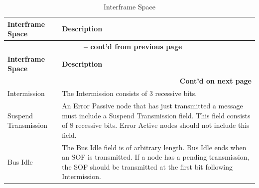 \begin{longtable}[c]{|p{4cm}|p{11cm}|} 
  \caption{Interframe Space}
  \label{tab:twai-interframe-space} 
  \\\hline
  \rowcolor{lightgray}
  \textbf{Interframe Space} & \textbf{Description}
  \\\hline
  \endfirsthead
  
  \multicolumn{2}{c}{\bfseries \tablename\ \thetable{} -- cont'd from previous page}\\  \hline
  
  \rowcolor{lightgray}
    \textbf{Interframe Space} & \textbf{Description}
  \\\hline
  \endhead
  
  \multicolumn{2}{r}{\textbf{Cont'd on next page}} \\
  \endfoot
  \endlastfoot

    Intermission & The Intermission consists of 3 recessive bits.
           \\\hline
    Suspend Transmission & An Error Passive node that has just transmitted a message must include a Suspend Transmission field. This field consists of 8 recessive bits. Error Active nodes should not include this field.
            \\\hline
    Bus Idle & The Bus Idle field is of arbitrary length. Bus Idle ends when an SOF is transmitted. If a node has a pending transmission, the SOF should be transmitted at the first bit following Intermission.         
            \\\hline
    
\end{longtable}
